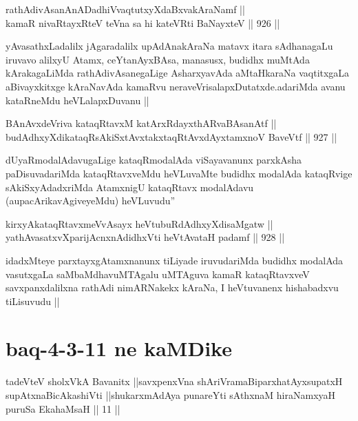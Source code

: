 \begin{shl}
rathAdivAsanAnADadhiVvaqtutxyXdaBxvakAraNamf || \\
kamaR nivaRtayxRteV teVna sa hi kateVRti BaNayxteV ||  926 ||  
\end{shl}

\begin{artha}
yAvasathxLadalilx jAgaradalilx upAdAnakAraNa matavx itara sAdhanagaLu iruvavo alilxyU Atamx, ceYtanAyxBAsa, manasusx, budidhx muMtAda kArakagaLiMda rathAdivAsanegaLige AsharxyavAda aMtaHkaraNa vaqtitxgaLa aBivayxkitxge kAraNavAda kamaRvu neraveVrisalapxDutatxde.adariMda avanu kataRneMdu heVLalapxDuvanu ||
\end{artha}


\begin{shl}
BAnAvxdeVriva kataqRtavxM katArxRdayxthARvaBAsanAtf || \\
budAdhxyXdikataqRsAkiSxtAvxtakxtaqRtAvxdAyxtamxnoV BaveVtf ||  927 ||  
\end{shl}

\begin{artha}
dUyaRmodalAdavugaLige kataqRmodalAda viSayavanunx parxkAsha paDisuvadariMda kataqRtavxveMdu heVLuvaMte budidhx modalAda kataqRvige sAkiSxyAdadxriMda AtamxnigU kataqRtavx modalAdavu (aupacArikavAgiveyeMdu) heVLuvudu''
\end{artha}


\begin{shl}
kirxyAkataqRtavxmeVvAsayx heVtubuRdAdhxyXdisaMgatw || \\
yathAvasatxvXparijAcnxnAdidhxVti heVtAvataH padamf ||  928 ||  
\end{shl}

\begin{artha}
idadxMteye parxtayxgAtamxnanunx tiLiyade iruvudariMda budidhx modalAda vasutxgaLa saMbaMdhavuMTAgalu uMTAguva kamaR kataqRtavxveV savxpanxdalilxna rathAdi nimARNakekx  kAraNa, I heVtuvanenx hishabadxvu tiLisuvudu ||
\end{artha}

\section*{baq-4-3-11 ne kaMDike}

\begin{shl}
tadeVteV sholxVkA Bavanitx ||savxpenxVna shAriVramaBiparxhatAyxsupatxH supAtxnaBicAkashiVti ||shukarxmAdAya punareYti sAthxnaM hiraNamxyaH puruSa EkahaMsaH || 11 ||
\end{shl}

